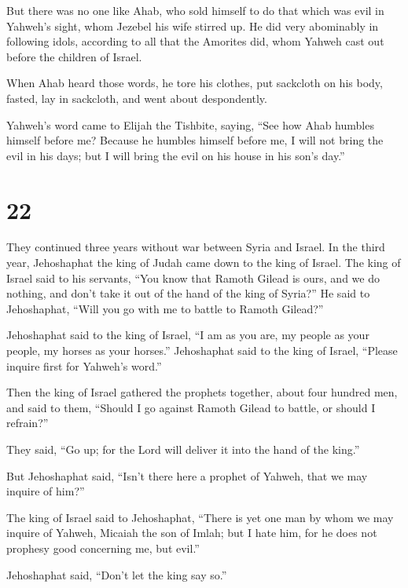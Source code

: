  But there was no one like Ahab, who sold himself to do
that which was evil in Yahweh's sight, whom Jezebel his wife stirred up.
 He did very abominably in following idols, according to
all that the Amorites did, whom Yahweh cast out before the children of
Israel.

 When Ahab heard those words, he tore his clothes, put
sackcloth on his body, fasted, lay in sackcloth, and went about
despondently.

 Yahweh's word came to Elijah the Tishbite, saying,
 ``See how Ahab humbles himself before me? Because he
humbles himself before me, I will not bring the evil in his days; but I
will bring the evil on his house in his son's day.''

\hypertarget{section-21}{%
\section{22}\label{section-21}}

 They continued three years without war between Syria and
Israel.  In the third year, Jehoshaphat the king of Judah
came down to the king of Israel.  The king of Israel said to
his servants, ``You know that Ramoth Gilead is ours, and we do nothing,
and don't take it out of the hand of the king of Syria?'' 
He said to Jehoshaphat, ``Will you go with me to battle to Ramoth
Gilead?''

Jehoshaphat said to the king of Israel, ``I am as you are, my people as
your people, my horses as your horses.''  Jehoshaphat said
to the king of Israel, ``Please inquire first for Yahweh's word.''

 Then the king of Israel gathered the prophets together,
about four hundred men, and said to them, ``Should I go against Ramoth
Gilead to battle, or should I refrain?''

They said, ``Go up; for the Lord will deliver it into the hand of the
king.''

 But Jehoshaphat said, ``Isn't there here a prophet of
Yahweh, that we may inquire of him?''

 The king of Israel said to Jehoshaphat, ``There is yet one
man by whom we may inquire of Yahweh, Micaiah the son of Imlah; but I
hate him, for he does not prophesy good concerning me, but evil.''

Jehoshaphat said, ``Don't let the king say so.''

